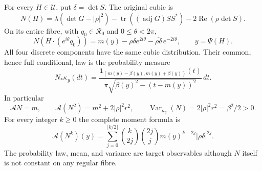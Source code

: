 \begin{theorem}\label{rm:cubic-law}
For every $H\in\mathcal U$, put $\delta=\det S$. The original cubic is
\begin{equation}\label{rm:cubic-coordinate-formula}
 N(H)=\lambda(\det G-|\rho|^2)
       -\operatorname{tr}((\operatorname{adj}G)SS^*)
       -2\operatorname{Re}(\rho\det S).
\end{equation}
On its entire fibre, with $q_0\in\mathcal R_0$ and $0\leq\theta<2\pi$,
\begin{equation}\label{rm:cubic-fourier}
 N(H\cdot(e^{i\theta}q_0))
   =m(y)-\rho\delta e^{2i\theta}
          -\overline{\rho\delta}\,e^{-2i\theta},\qquad y=\Psi(H).
\end{equation}
All four discrete components have the same cubic distribution. Their
common, hence full conditional, law is the probability measure
\begin{equation}\label{rm:arcsine-law}
 N_*\kappa_y(dt)
 =\frac{\mathbf1_{(m(y)-\beta(y),m(y)+\beta(y))}(t)}
        {\pi\sqrt{\beta(y)^2-(t-m(y))^2}}\,dt.
\end{equation}
In particular
\begin{equation}\label{rm:first-two-moments}
 \mathcal A N=m,\qquad
 \mathcal A(N^2)=m^2+2|\rho|^2r^2,\qquad
 \operatorname{Var}_{\kappa_y}(N)=2|\rho|^2r^2=\beta^2/2>0.
\end{equation}
For every integer $k\geq0$ the complete moment formula is
\begin{equation}\label{rm:all-moments}
 \mathcal A(N^k)(y)=
 \sum_{j=0}^{\lfloor k/2\rfloor}
  \binom{k}{2j}\binom{2j}{j}
       m(y)^{k-2j}|\rho\delta|^{2j}.
\end{equation}
The probability law, mean, and variance are target observables although
$N$ itself is not constant on any regular fibre.
\end{theorem}
